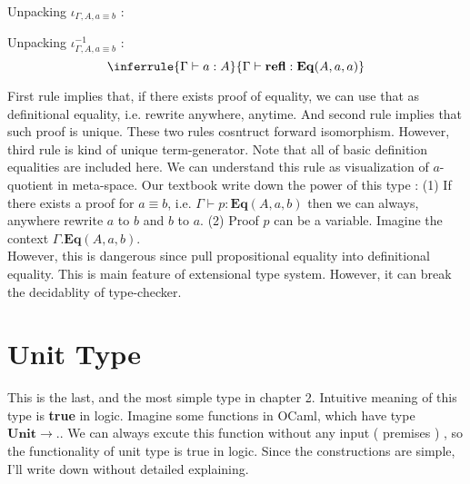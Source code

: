 \documentclass[12pt, a4paper, openany, twoside]{book}
\theoremstyle{definition}
\theoremstyle{remark}
\theoremstyle{plain}
\numberwithin{equation}{section}
\begin{document}
\begin{tcolorbox}[colback=yellow!10!white,colframe=green!75!black,title=Construction 2.4.4.]\hypertarget{const 2.4.4.}{}
Unpacking $\iota_{\Gamma, A, a\equiv b}$ : 
\vspace{4mm}
Unpacking $\iota_{\Gamma, A, a\equiv b}^{-1}$ : 
\[
\inferrule
{
    \Gamma \vdash a : A 
}
{
    \Gamma \vdash \mathbf{refl} : \mathbf{Eq}(A, a, a)
}
\]
\end{tcolorbox}

\vspace{4mm}

First rule implies that, if there exists proof of equality, we can use that as definitional equality, i.e. rewrite anywhere, anytime. 
And second rule implies that such proof is unique. These two rules cosntruct forward isomorphism. However, 
third rule is kind of unique term-generator. Note that all of basic definition equalities are included here. 
We can understand this rule as visualization of $a$-quotient in meta-space. Our textbook write down the power of this type : 
(1) If there exists a proof for $a \equiv b$, i.e. $\Gamma \vdash p : \mathbf{Eq}(A, a, b)$ then we can always, anywhere rewrite $a$ to $b$ and $b$ to $a$. 
(2) Proof $p$ can be a variable. Imagine the context $\Gamma.\mathbf{Eq}(A, a, b)$. \\
However, this is dangerous since pull propositional equality into definitional equality. This is main feature of extensional type system. However, 
it can break the decidablity of type-checker. 

\newpage 

\section{Unit Type}

This is the last, and the most simple type in chapter 2. Intuitive meaning of this type is \textbf{true} in logic. 
Imagine some functions in OCaml, which have type $\mathbf{Unit} \rightarrow ..$ 
We can always excute this function without any input ( premises ) , so the functionality of unit type is 
true in logic. Since the constructions are simple, I'll write down without detailed explaining. 
\end{document}
